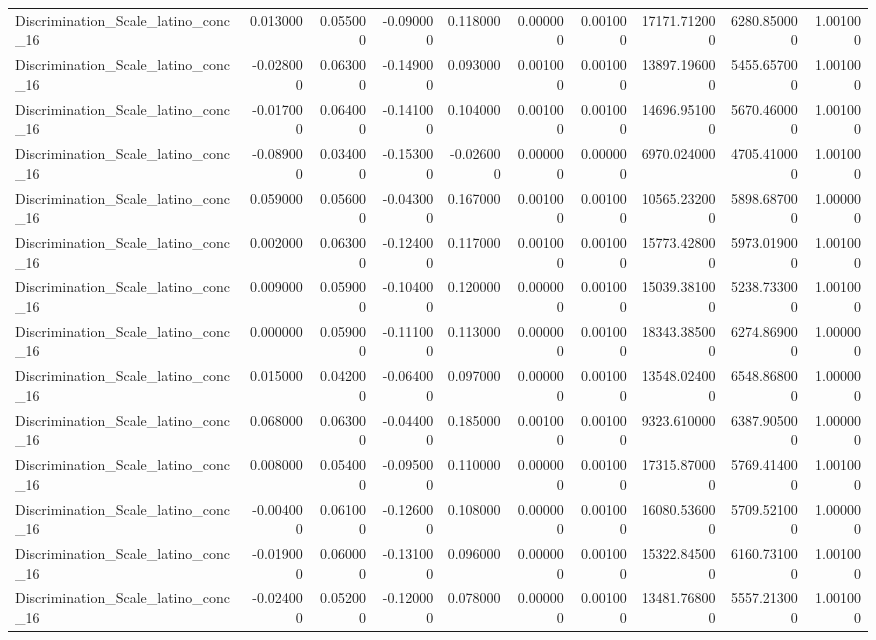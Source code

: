 \begin{table}
\begin{tabular}{lrrrrrrrrr}
Discrimination_Scale_latino_conc_16 & 0.013000 & 0.055000 & -0.090000 & 0.118000 & 0.000000 & 0.001000 & 17171.712000 & 6280.850000 & 1.001000 \\
Discrimination_Scale_latino_conc_16 & -0.028000 & 0.063000 & -0.149000 & 0.093000 & 0.001000 & 0.001000 & 13897.196000 & 5455.657000 & 1.001000 \\
Discrimination_Scale_latino_conc_16 & -0.017000 & 0.064000 & -0.141000 & 0.104000 & 0.001000 & 0.001000 & 14696.951000 & 5670.460000 & 1.001000 \\
Discrimination_Scale_latino_conc_16 & -0.089000 & 0.034000 & -0.153000 & -0.026000 & 0.000000 & 0.000000 & 6970.024000 & 4705.410000 & 1.001000 \\
Discrimination_Scale_latino_conc_16 & 0.059000 & 0.056000 & -0.043000 & 0.167000 & 0.001000 & 0.001000 & 10565.232000 & 5898.687000 & 1.000000 \\
Discrimination_Scale_latino_conc_16 & 0.002000 & 0.063000 & -0.124000 & 0.117000 & 0.001000 & 0.001000 & 15773.428000 & 5973.019000 & 1.001000 \\
Discrimination_Scale_latino_conc_16 & 0.009000 & 0.059000 & -0.104000 & 0.120000 & 0.000000 & 0.001000 & 15039.381000 & 5238.733000 & 1.001000 \\
Discrimination_Scale_latino_conc_16 & 0.000000 & 0.059000 & -0.111000 & 0.113000 & 0.000000 & 0.001000 & 18343.385000 & 6274.869000 & 1.000000 \\
Discrimination_Scale_latino_conc_16 & 0.015000 & 0.042000 & -0.064000 & 0.097000 & 0.000000 & 0.001000 & 13548.024000 & 6548.868000 & 1.000000 \\
Discrimination_Scale_latino_conc_16 & 0.068000 & 0.063000 & -0.044000 & 0.185000 & 0.001000 & 0.001000 & 9323.610000 & 6387.905000 & 1.000000 \\
Discrimination_Scale_latino_conc_16 & 0.008000 & 0.054000 & -0.095000 & 0.110000 & 0.000000 & 0.001000 & 17315.870000 & 5769.414000 & 1.001000 \\
Discrimination_Scale_latino_conc_16 & -0.004000 & 0.061000 & -0.126000 & 0.108000 & 0.000000 & 0.001000 & 16080.536000 & 5709.521000 & 1.000000 \\
Discrimination_Scale_latino_conc_16 & -0.019000 & 0.060000 & -0.131000 & 0.096000 & 0.000000 & 0.001000 & 15322.845000 & 6160.731000 & 1.001000 \\
Discrimination_Scale_latino_conc_16 & -0.024000 & 0.052000 & -0.120000 & 0.078000 & 0.000000 & 0.001000 & 13481.768000 & 5557.213000 & 1.001000 \\

\end{tabular}
\end{table}
